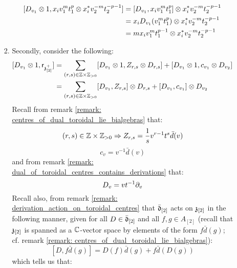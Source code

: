 \begin{remark}
\begin{enumerate}
\begin{enumerate}
\begin{enumerate}
$$\begin{aligned}
                                        [D_{v_1} \tensor 1, x_i v_1^m t_1^p \tensor x_i^* v_2^{-m} t_2^{-p - 1}] & = [D_{v_1}, x_i v_1^m t_1^p] \tensor x_i^* v_2^{-m} t_2^{-p - 1}
                                        \\
                                        & = x_i D_{v_1}(v_1^m t_1^p) \tensor x_i^* v_2^{-m} t_2^{-p - 1}
                                        \\
                                        & = m x_i v_1^m t_1^{p - 1} \tensor x_i^* v_2^{-m} t_2^{-p - 1}
                                    \end{aligned}
                                $$
                            \item Secondly, consider the following:
                                $$
                                    \begin{aligned}
                                        [D_{v_1} \tensor 1, \sfr_{\z_{[2]}^+}] & = \sum_{(r, s) \in \Z \x \Z_{> 0}} [D_{v_1} \tensor 1, Z_{r, s} \tensor D_{r, s}] + [D_{v_1} \tensor 1, c_{v_1} \tensor D_{v_2}]
                                        \\
                                        & = \sum_{(r, s) \in \Z \x \Z_{> 0}} [D_{v_1}, Z_{r, s}] \tensor D_{r, s} + [D_{v_1}, c_{v_1}] \tensor D_{v_2}
                                    \end{aligned}
                                $$
                            Recall from remark \ref{remark: centres_of_dual_toroidal_lie_bialgebras} that:
                                $$(r, s) \in \Z \x \Z_{> 0} \implies Z_{r, s} = \frac1s v^{r - 1} t^s \bar{d}(v)$$
                                $$c_v = v^{-1} \bar{d}(v)$$
                            and from remark \ref{remark: dual_of_toroidal_centres_contains_derivations} that:
                                $$D_v = v t^{-1} \del_v$$
                            Recall also, from remark \ref{remark: derivation_action_on_toroidal_centres} that $\bar{\d}_{[2]}$ acts on $\z_{[2]}$ in the following manner, given for all $D \in \bar{\d}_{[2]}$ and all $f, g \in A_{[2]}$ (recall that $\z_{[2]}$ is spanned as a $\bbC$-vector space by elements of the form $f \bar{d}(g)$; cf. remark \ref{remark: centres_of_dual_toroidal_lie_bialgebras}):
                                $$[D, f \bar{d}(g)] = D(f) \bar{d}(g) + f \bar{d}( D(g) )$$
                            which tells us that:
                                $$
                                    \begin{aligned}

\end{aligned}$$
\end{enumerate}
\end{enumerate}
\end{enumerate}
\end{remark}
